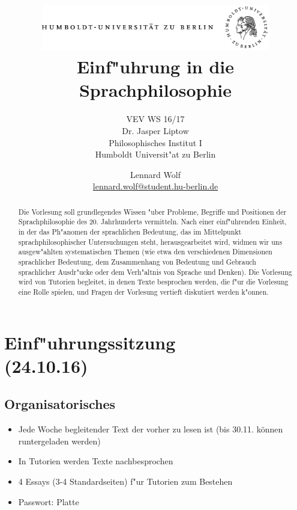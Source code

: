 \documentclass[]{scrartcl}
\begin{document}
\title{
	\includegraphics*[width=0.75\textwidth]{images/hu_logo.png}\\
	\vspace{24pt}
	Einf"uhrung in die Sprachphilosophie}
\subtitle{VEV WS 16/17\\
          Dr. Jasper Liptow\\
          Philosophisches Institut I \\ 
          Humboldt Universit"at zu Berlin}
\author{Lennard Wolf\\
        \href{mailto:lennard.wolf@student.hu-berlin.de}{lennard.wolf@student.hu-berlin.de}}
\maketitle
\begin{abstract}

Die Vorlesung soll grundlegendes Wissen "uber Probleme, Begriffe und Positionen der Sprachphilosophie des 20. Jahrhunderts vermitteln. Nach einer einf"uhrenden Einheit, in der das Ph"anomen der sprachlichen Bedeutung, das im Mittelpunkt sprachphilosophischer Untersuchungen steht, herausgearbeitet wird, widmen wir uns ausgew"ahlten systematischen Themen (wie etwa den verschiedenen Dimensionen sprachlicher Bedeutung, dem Zusammenhang von Bedeutung und Gebrauch sprachlicher Ausdr"ucke oder dem Verh"altnis von Sprache und Denken). Die Vorlesung wird von Tutorien begleitet, in denen Texte besprochen werden, die f"ur die Vorlesung eine Rolle spielen, und Fragen der Vorlesung vertieft diskutiert werden k"onnen.


\end{abstract}
\newpage

\tableofcontents
\listoffigures
\newpage


\section{Einf"uhrungssitzung\\(24.10.16)}
\subsection{Organisatorisches}

\begin{itemize}
  \item Jede Woche begleitender Text der vorher zu lesen ist (bis 30.11. können runtergeladen werden)
  \item In Tutorien werden Texte nachbesprochen
  \item 4 Essays (3-4 Standardseiten) f"ur Tutorien zum Bestehen 
  \item Passwort: Platte
\end{itemize}
\end{document}
